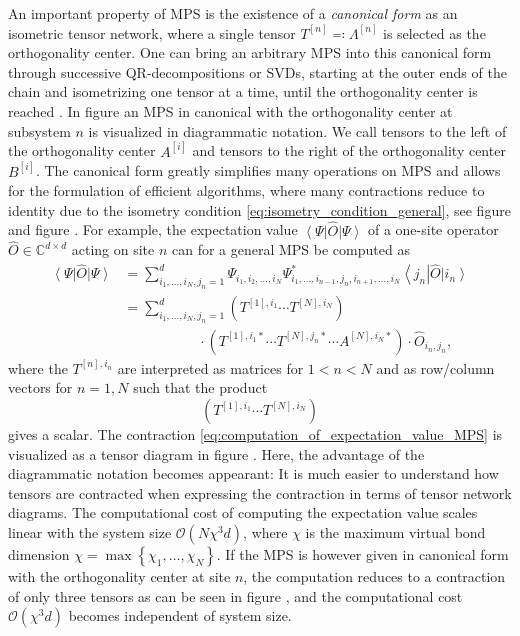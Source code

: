 An important property of MPS is the existence of a \textit{canonical form} as an isometric tensor network, where a single tensor $T^{[n]} \eqqcolon \Lambda^{[n]}$ is selected as the orthogonality center. One can bring an arbitrary MPS into this canonical form through successive QR-decompositions or SVDs, starting at the outer ends of the chain and isometrizing one tensor at a time, until the orthogonality center is reached \cite{cite:DMRG_in_the_age_of_MPS}. In figure  an MPS in canonical with the orthogonality center at subsystem $n$ is visualized in diagrammatic notation. We call tensors to the left of the orthogonality center $A^{[i]}$ and tensors to the right of the orthogonality center $B^{[i]}$. The canonical form greatly simplifies many operations on MPS and allows for the formulation of efficient algorithms, where many contractions reduce to identity due to the isometry condition \eqref{eq:isometry_condition_general}, see figure  and figure . For example, the expectation value $\left\langle\Psi\right|\hat{O}\left|\Psi\right\rangle$ of a one-site operator $\hat{O} \in \mathbb{C}^{d\times d}$ acting on site $n$ can for a general MPS be computed as
\begin{equation}
\begin{split}
	\label{eq:computation_of_expectation_value_MPS}
	\left\langle\Psi\right|\hat{O}\left|\Psi\right\rangle &=\sum_{i_1,\dots,i_N,j_n=1}^{d}\Psi_{i_1,i_2,\dots,i_N} \Psi_{i_1,\dots,i_{n-1},j_n,i_{n+1},\dots,i_N}^* \left\langle j_n\right|\hat{O} \left|i_n\right\rangle \\
	&= \sum_{i_1,\dots,i_N,j_n=1}^{d} \left(T^{[1],i_1}\cdots T^{[N],i_N}\right) \\
	&\quad\quad\quad\quad\quad\,\,\cdot\left(T^{[1],i_1*}\cdots T^{[N],j_n*} \cdots A^{[N],i_N*}\right)\cdot \hat{O}_{i_n,j_n},
\end{split}
\end{equation}
where the $T^{[n],i_n}$ are interpreted as matrices for $1 < n < N$ and as row/column vectors for $n = 1, N$ such that the product
\begin{equation}
	\left(T^{[1],i_1}\cdots T^{[N],i_N}\right)
\end{equation}
gives a scalar. The contraction \eqref{eq:computation_of_expectation_value_MPS} is visualized as a tensor diagram in figure . Here, the advantage of the diagrammatic notation becomes appearant: It is much easier to understand how tensors are contracted when expressing the contraction in terms of tensor network diagrams. The computational cost of computing the expectation value scales linear with the system size $\mathcal{O}\left(N\chi^3d\right)$, where $\chi$ is the maximum virtual bond dimension $\chi = \max\left\{\chi_1,\dots,\chi_N\right\}$. If the MPS is however given in canonical form with the orthogonality center at site $n$, the computation reduces to a contraction of only three tensors as can be seen in figure , and the computational cost $\mathcal{O}\left(\chi^3d\right)$ becomes independent of system size. \par
